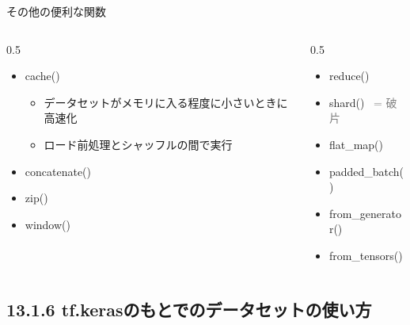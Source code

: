 \documentclass[aspectratio=169, dvipdfmx, 14pt, xcolor={svgnames,dvipsnames}, t]{beamer}
\newlength{\mytotalwidth}
\newlength{\mycolumnwidth}
\begin{document}

\begin{frame}{その他の便利な関数}
  \begin{columns}[totalwidth=\mytotalwidth]
    \begin{column}[t]{0.5\mycolumnwidth}
      \begin{itemize}
        \tightlist
        \item
              cache()

              \begin{itemize}
                \tightlist
                \item
                      データセットがメモリに入る程度に小さいときに高速化
                \item
                      ロード前処理とシャッフルの間で実行
              \end{itemize}
        \item
              concatenate()
        \item
              zip()
        \item
              window()
      \end{itemize}
    \end{column}
    \begin{column}[t]{0.5\mycolumnwidth}
      \begin{itemize}
        \item
              reduce()
        \item
              shard()\ \textcolor{gray}{ = 破片}
        \item
              flat\_map()
        \item
              padded\_batch()
        \item
              from\_generator()
        \item
              from\_tensors()
      \end{itemize}
    \end{column}
  \end{columns}

\end{frame}


\hypertarget{tf.kerasux306eux3082ux3068ux3067ux306eux30c7ux30fcux30bfux30bbux30c3ux30c8ux306eux4f7fux3044ux65b9}{%
  \subsection{13.1.6 tf.kerasのもとでのデータセットの使い方}\label{tf.kerasux306eux3082ux3068ux3067ux306eux30c7ux30fcux30bfux30bbux30c3ux30c8ux306eux4f7fux3044ux65b9}}
\end{document}
